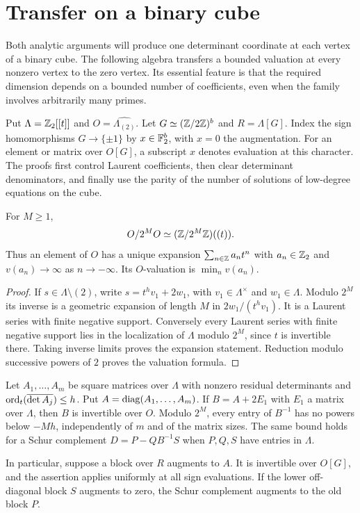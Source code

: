 \section{Transfer on a binary cube}\label{sec:binary-algebra}
\label{sec:h:binary-algebra}

Both analytic arguments will produce one determinant coordinate at each
vertex of a binary cube. The following algebra transfers a bounded
valuation at every nonzero vertex to the zero vertex. Its essential
feature is that the required dimension depends on a bounded number of
coefficients, even when the family involves arbitrarily many primes.

Put $\Lambda=\mathbb Z_2[[t]]$ and
$O=\widehat{\Lambda_{(2)}}$. Let $G\simeq(\mathbb Z/2\mathbb Z)^b$ and
$R=\Lambda[G]$. Index the sign homomorphisms $G\to\{\pm1\}$
by $x\in\mathbb F_2^b$, with $x=0$ the augmentation. For an element or
matrix over $O[G]$, a subscript $x$ denotes evaluation at this character.
The proofs first control Laurent coefficients, then clear determinant
denominators, and finally use the parity of the number of solutions of
low-degree equations on the cube.

\begin{lemma}\label{lem:h:laurent-expansions}
For $M\ge1$,
\[
 O/2^MO\simeq(\mathbb Z/2^M\mathbb Z)((t)).
\]
Thus an element of $O$ has a unique expansion
$\sum_{n\in\mathbb Z}a_nt^n$ with $a_n\in\mathbb Z_2$ and
$v(a_n)\to\infty$ as $n\to-\infty$. Its $O$-valuation is
$\min_n v(a_n)$.
\end{lemma}

\begin{proof}
If $s\in\Lambda\setminus(2)$, write
$s=t^h v_1+2w_1$, with $v_1\in\Lambda^\times$ and
$w_1\in\Lambda$. Modulo $2^M$ its inverse is a geometric expansion
of length $M$ in $2w_1/(t^h v_1)$. It is a Laurent series with finite
negative support. Conversely every Laurent series with finite negative
support lies in the localization of $\Lambda$ modulo $2^M$, since
$t$ is invertible there. Taking inverse limits proves the expansion
statement. Reduction modulo successive powers of $2$ proves the
valuation formula.
\end{proof}

\begin{lemma}
\label{lem:h:bounded-poles}
Let $A_1,\ldots,A_m$ be square matrices over $\Lambda$ with nonzero
residual determinants and
$\operatorname{ord}_t(\overline{\det A_j})\le h$. Put
$A=\operatorname{diag}(A_1,\ldots,A_m)$. If $B=A+2E_1$ with $E_1$ a matrix over
$\Lambda$, then $B$ is invertible over $O$. Modulo $2^M$, every entry
of $B^{-1}$ has no powers below $-Mh$, independently of $m$ and of
the matrix sizes. The same bound holds for a Schur complement
$D=P-QB^{-1}S$ when $P,Q,S$ have entries in $\Lambda$.

In particular, suppose a block over $R$ augments to $A$. It is
invertible over $O[G]$, and the assertion applies uniformly at all sign
evaluations. If the lower off-diagonal block $S$ augments to zero, the
Schur complement augments to the old block $P$.
\end{lemma}


